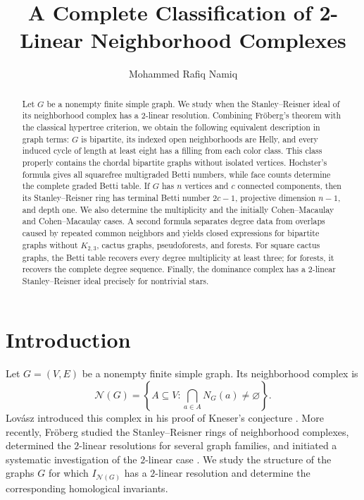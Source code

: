 \documentclass[11pt]{amsart}
\title[Neighborhood complexes with 2-linear Stanley--Reisner ideals]{A Complete Classification of 2-Linear Neighborhood Complexes}
\author{Mohammed Rafiq Namiq}
\date{}
\theoremstyle{definition}
\theoremstyle{remark}
\numberwithin{equation}{section}
\newcommand{\NN}{\mathcal N}
\begin{document}
	
	\begin{abstract}
		Let \(G\) be a nonempty finite simple graph. We study when the
		Stanley--Reisner ideal of its neighborhood complex has a \(2\)-linear
		resolution. Combining Fr\"oberg's theorem with the classical hypertree criterion, we obtain the following equivalent description in graph terms: \(G\) is bipartite, its 
		indexed open neighborhoods are Helly, and every induced cycle of length at least eight has
		a filling from each color class. This class properly contains the chordal
		bipartite graphs without isolated vertices. Hochster's formula gives all
		squarefree multigraded Betti numbers, while face counts determine the complete
		graded Betti table. If \(G\) has \(n\) vertices and \(c\) connected
		components, then its Stanley--Reisner ring has terminal Betti number
		\(2c-1\), projective dimension \(n-1\), and depth one. We also determine
		the multiplicity and the initially Cohen--Macaulay and Cohen--Macaulay cases.
		A second formula separates degree data from overlaps caused by repeated common
		neighbors and yields closed expressions for bipartite graphs without
		\(K_{2,3}\), cactus graphs, pseudoforests, and forests. For square cactus
		graphs, the Betti table recovers every degree multiplicity at least three; for
		forests, it recovers the complete degree sequence. Finally, the dominance
		complex has a \(2\)-linear Stanley--Reisner ideal precisely for nontrivial
		stars.
	\end{abstract}
	
	\maketitle
	
	\section{Introduction}
	Let \(G=(V,E)\) be a nonempty finite simple graph. Its neighborhood
	complex is
	\[
	\NN(G)=
	\left\{
	A\subseteq V:
	\bigcap_{a\in A}N_G(a)\ne\varnothing
	\right\}.
	\]
	Lov\'asz introduced this complex in his proof of Kneser's conjecture
	\cite{Lovasz1978}. More recently, Fr\"oberg studied the Stanley--Reisner
	rings of neighborhood complexes, determined the \(2\)-linear resolutions
	for several graph families, and initiated a systematic investigation of
	the \(2\)-linear case \cite{Froberg2026}. We study the structure of the
	graphs \(G\) for which \(I_{\NN(G)}\) has a \(2\)-linear resolution and
	determine the corresponding homological invariants.
\end{document}
